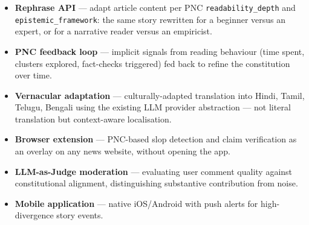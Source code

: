 \documentclass[9pt,a4paper,twocolumn]{article}
\begin{document}
\begin{itemize}
  \item \textbf{Rephrase API} — adapt article content per PNC \texttt{readability\_depth} and \texttt{epistemic\_framework}: the same story rewritten for a beginner versus an expert, or for a narrative reader versus an empiricist.
  \item \textbf{PNC feedback loop} — implicit signals from reading behaviour (time spent, clusters explored, fact-checks triggered) fed back to refine the constitution over time.
  \item \textbf{Vernacular adaptation} — culturally-adapted translation into Hindi, Tamil, Telugu, Bengali using the existing LLM provider abstraction — not literal translation but context-aware localisation.
  \item \textbf{Browser extension} — PNC-based slop detection and claim verification as an overlay on any news website, without opening the app.
  \item \textbf{LLM-as-Judge moderation} — evaluating user comment quality against constitutional alignment, distinguishing substantive contribution from noise.
  \item \textbf{Mobile application} — native iOS/Android with push alerts for high-divergence story events.
\end{itemize}

\vfill
\noindent{\color{etred}\rule{\columnwidth}{1.5pt}}\\[2pt]
\end{document}
